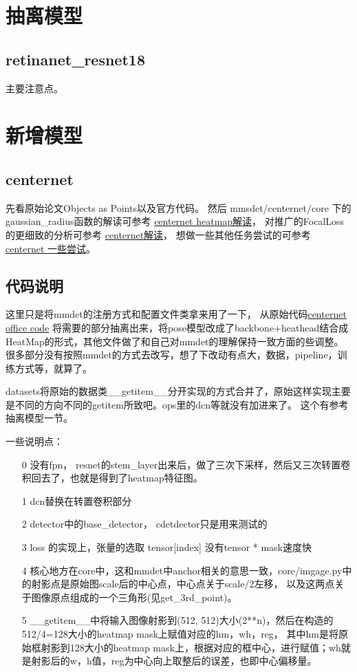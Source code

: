 \documentclass[UTF8]{ctexart}
\begin{document}
\section{抽离模型}
\subsection{retinanet\_resnet18}
主要注意点。

\section{新增模型}
\subsection{centernet}
先看原始论文Objects as Points以及官方代码。
然后
mmsdet/centernet/core 下的gaussian\_radius函数的解读可参考
\href{https://zhuanlan.zhihu.com/p/96856635}{centernet heatmap解读}，
对推广的FocalLoss的更细致的分析可参考
\href{https://zhuanlan.zhihu.com/p/66048276}{centernet解读}，
想做一些其他任务尝试的可参考
\href{https://zhuanlan.zhihu.com/p/76378871}{centernet 一些尝试}。

\subsection{代码说明}
这里只是将mmdet的注册方式和配置文件类拿来用了一下，
从原始代码\href{https://github.com/xingyizhou/CenterNet}{centernet office code}
将需要的部分抽离出来，将pose模型改成了backbone+heathead结合成HeatMap的形式，其他文件做了和自己对mmdet的理解保持一致方面的些调整。
很多部分没有按照mmdet的方式去改写，想了下改动有点大，数据，pipeline，训练方式等，就算了。

datasets将原始的数据类\_\_getitem\_\_分开实现的方式合并了，原始这样实现主要是不同的方向不同的getitem所致吧。ops里的dcn等就没有加进来了。
这个有参考抽离模型一节。

一些说明点：
\begin{itemize}
	\item[0] 没有fpn， resnet的stem\_layer出来后，做了三次下采样，然后又三次转置卷积回去了，也就是得到了heatmap特征图。
	\item[1] dcn替换在转置卷积部分
	\item[2] detector中的base\_detector， cdetdector只是用来测试的
	\item[3] loss 的实现上，张量的选取 tensor[index] 没有tensor * mask速度快
	\item[4] 核心地方在core中，这和mmdet中anchor相关的意思一致，core/imgage.py中的射影点是原始图scale后的中心点，中心点关于scale/2左移，
	以及这两点关于图像原点组成的一个三角形(见get\_3rd\_point)。
	\item[5] \_\_getitem\_\_中将输入图像射影到(512, 512)大小(2**n)，然后在构造的512/4=128大小的heatmap mask上赋值对应的hm，wh，reg，
	其中hm是将原始框射影到128大小的heatmap mask上，根据对应的框中心，进行赋值；wh就是射影后的w，h值，reg为中心向上取整后的误差，也即中心偏移量。
\end{itemize}
\end{document}
